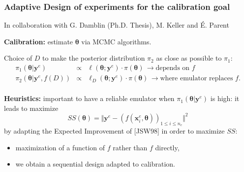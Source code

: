 \documentclass[nopagenumber,9pt]{beamer}
\newcommand{\E}{\mathbb{E}}
\newcommand{\btheta}{\boldsymbol{\theta}}
\newcommand{\by}{\mathbf{y}}
\newcommand{\bx}{\mathbf{x}}
\newcommand{\bxf}{\bx^e}
\newcommand{\nf}{n_e}
\newcommand{\byf}{\by^e}
\newcommand{\citemano}[1]{\textcolor{dgreen}{#1}}
\begin{document}
\begin{frame}
 \frametitle{Adaptive Design of experiments for the calibration goal}
 In collaboration with G. Damblin (Ph.D. Thesis), M. Keller and É. Parent \cite{barbillondamblin}


 \bigskip
\textbf{Calibration:} estimate $\btheta$ via MCMC algorithms.

 \smallskip
 Choice of $D$ to make the posterior distribution $\pi_2$ as close as possible to $\pi_1$:
 \begin{eqnarray*}
 \pi_1(\btheta|\byf)&\propto& \ell(\btheta;\byf) \cdot\pi(\btheta)\, \rightarrow \text{depends on }f\\
 \pi_2(\btheta|\byf,f(D))&\propto& \ell_D(\btheta;\byf)\cdot\pi(\btheta)\, \rightarrow \text{where emulator replaces } f.\\
\end{eqnarray*}


 \medskip
 \textbf{Heuristics:} important to have a reliable emulator when $\pi_1(\btheta|\byf)$ is high:
 it leads to maximize
 $$SS(\btheta)=\Vert \byf-(f(\bxf_i,\btheta))_{1\le i\le \nf} \Vert^2$$
 by adapting the Expected Improvement of \citemano{[JSW98]} in order to maximize $SS$:

\smallskip
\begin{itemize}
 \item maximization of a function of $f$ rather than $f$ directly,
 \smallskip
 \item we obtain a sequential design adapted to calibration.
\end{itemize}


\end{frame}
\end{document}
